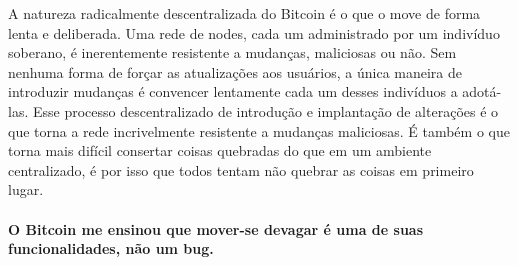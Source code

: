A natureza radicalmente descentralizada do Bitcoin é o que o move de forma lenta e deliberada. Uma rede de nodes, cada um administrado por um indivíduo soberano, é inerentemente resistente a mudanças, maliciosas ou não. Sem nenhuma forma de forçar as atualizações aos usuários, a única maneira de introduzir mudanças é convencer lentamente cada um desses indivíduos a adotá-las. Esse processo descentralizado de introdução e implantação de alterações é o que torna a rede incrivelmente resistente a mudanças maliciosas. É também o que torna mais difícil consertar coisas quebradas do que em um ambiente centralizado, é por isso que todos tentam não quebrar as coisas em primeiro lugar.

\paragraph{O Bitcoin me ensinou que mover-se devagar é uma de suas funcionalidades, não um bug.}

%
%
%
%
%
%
%
